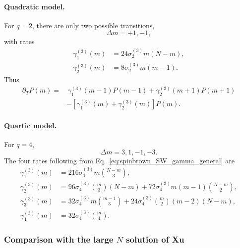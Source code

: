 \documentclass{article}
\theoremstyle{definition}
\begin{document}
\paragraph{Quadratic model.}

For $q=2$, there are only two possible transitions,
\begin{equation}
    \Delta m=+1,-1,
\end{equation}
with rates
\begin{align}
    \gamma_1^{(3)}(m)
    &=
    24\sigma_2^{(3)}m(N-m),
    \label{eq:spinbrown_SW_q2_up}\\
    \gamma_2^{(3)}(m)
    &=
    8\sigma_2^{(3)}m(m-1).
    \label{eq:spinbrown_SW_q2_down}
\end{align}
Thus
\begin{align}
    \partial_TP(m)
    =&\,
    \gamma_1^{(3)}(m-1)P(m-1)
    +
    \gamma_2^{(3)}(m+1)P(m+1)
    \nonumber\\
    &-
    \left[
       \gamma_1^{(3)}(m)
       +
       \gamma_2^{(3)}(m)
    \right]P(m).
    \label{eq:spinbrown_SW_q2_master}
\end{align}


\paragraph{Quartic model.}

For $q=4$,
\begin{equation}
    \Delta m=3,1,-1,-3.
\end{equation}
The four rates following from
Eq.~\eqref{eq:spinbrown_SW_gamma_general} are
\begin{align}
    \gamma_1^{(3)}(m)
    &=
    216\sigma_4^{(3)}
    m\binom{N-m}{3},
    \label{eq:spinbrown_SW_q4_g1}\\
    \gamma_2^{(3)}(m)
    &=
    96\sigma_4^{(3)}
    \binom{m}{3}(N-m)
    +
    72\sigma_4^{(3)}
    m(m-1)\binom{N-m}{2},
    \label{eq:spinbrown_SW_q4_g2}\\
    \gamma_3^{(3)}(m)
    &=
    32\sigma_4^{(3)}
    m\binom{m-1}{3}
    +
    24\sigma_4^{(3)}
    \binom{m}{2}(m-2)(N-m),
    \label{eq:spinbrown_SW_q4_g3}\\
    \gamma_4^{(3)}(m)
    &=
    32\sigma_4^{(3)}
    \binom{m}{4}.
    \label{eq:spinbrown_SW_q4_g4}
\end{align}


\subsubsection{Comparison with the large $N$ solution of Xu}
\end{document}

